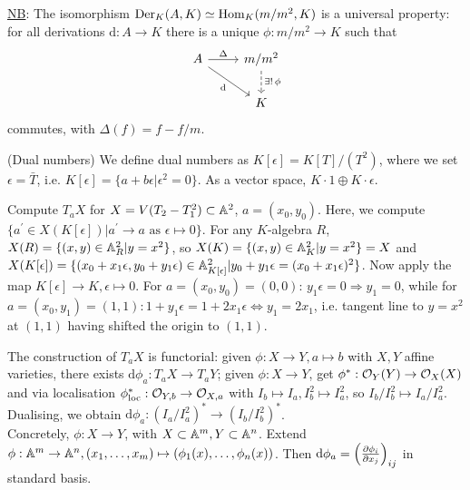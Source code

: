 \documentclass[a4paper,11pt]{article}
\begin{document}
{				\noindent\underline{NB}: The isomorphism $\der_K(A,K)\simeq\Hom_K(m/m^2,K)$ is a universal property: for all derivations $\mathrm{d}:A\rightarrow K$ there is a unique $\phi:m/m^2\rightarrow K$ such that 
				\begin{equation*}
					\begin{tikzcd}
						A\ar[r,"\Delta"]\ar[dr,"\mathrm{d}"'] & m/m^2\ar[d,dashed,"\exists !\,\phi"]\\
						& K
					\end{tikzcd}
				\end{equation*}
				commutes, with $\Delta(f)=f-f/m$.

				\begin{defi}
					(Dual numbers) We define dual numbers as $K[\epsilon]=K[T]/(T^2)$, where we set $\epsilon=\bar{T}$, i.e. $K[\epsilon]=\{a+b\epsilon|\epsilon^2=0\}$. As a vector space, $K\cdot 1\oplus K\cdot\epsilon$.
				\end{defi}

				\begin{eg}
					Compute $T_aX$ for $X=V(T_2-T_1^2)\subset\AA^2$, $a=(x_0,y_0)$. Here, we compute $\{a^\prime\in X(K[\epsilon])|a^\prime\rightarrow a\text{ as }\epsilon\mapsto 0\}$. For any $K$-algebra $R$, $X(R)=\{(x,y)\in\AA^2_R|y=x^2\}$, so $X(K)=\{(x,y)\in\AA^2_K|y=x^2\}=X$ and $X(K[\epsilon])=\{(x_0+x_1\epsilon,y_0+y_1\epsilon)\in\AA^2_{K[\epsilon]}|y_0+y_1\epsilon=(x_0+x_1\epsilon)^2\}$. Now apply the map $K[\epsilon]\rightarrow K, \epsilon\mapsto 0$. For $a=(x_0,y_0)=(0,0)$: $y_1\epsilon=0\Longrightarrow y_1=0$, while for  $a=(x_0,y_1)=(1,1): 1+y_1\epsilon=1+2x_1\epsilon\Longleftrightarrow y_1=2x_1$, i.e. tangent line to $y=x^2$ at $(1,1)$ having shifted the origin to $(1,1)$. 
				\end{eg}

				The construction of $T_aX$ is functorial: given $\phi:X\rightarrow Y,a\mapsto b$ with $X,Y$ affine varieties, there exists $\mathrm{d}\phi_a:T_aX\rightarrow T_aY$; given $\phi:X\rightarrow Y$, get $\phi^\ast:\O_Y(Y)\rightarrow\O_X(X)$ and via localisation $\phi^\ast_\text{loc}:\O_{Y,b}\rightarrow\O_{X,a}$ with $I_b\mapsto I_a, I_b^2\mapsto I_a^2$, so $I_b/I_b^2\mapsto I_a/I_a^2$. Dualising, we obtain $\mathrm{d}\phi_a:(I_a/I_a^2)^\ast\rightarrow (I_b/I_b^2)^\ast$.
				\\

				Concretely, $\phi:X\rightarrow Y$, with $X\subset\AA^m, Y\subset\AA^n$. Extend $\phi:\AA^m\rightarrow\AA^n,(x_1,\dots,x_m)\mapsto(\phi_1(x),\dots,\phi_n(x))$. Then $\mathrm{d}\phi_a=\left(\pd{\phi_i}{x_j}\right)_{ij}$ in standard basis.

}
\end{document}
